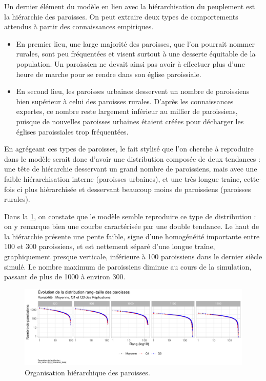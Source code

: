 Un dernier élément du modèle en lien avec la hiérarchisation du peuplement est la hiérarchie des paroisses.
On peut extraire deux types de comportements attendus à partir des connaissances empiriques.
\begin{itemize}
	\item En premier lieu, une large majorité des paroisses, que l'on pourrait nommer \og rurales\fg{}, sont peu fréquentées et visent surtout à une desserte équitable de la population.
	Un paroissien ne devait ainsi pas avoir à effectuer plus d'une heure de marche pour se rendre dans son église paroissiale.
	\item En second lieu, les paroisses \og urbaines\fg{} desservent un nombre de paroissiens bien supérieur à celui des paroisses rurales.
	D'après les connaissances expertes, ce nombre reste largement inférieur au millier de paroissiens, puisque de nouvelles paroisses urbaines étaient créées pour décharger les églises paroissiales trop fréquentées.
\end{itemize}
En agrégeant ces types de paroisses, le fait stylisé que l'on cherche à reproduire dans le modèle serait donc d'avoir une distribution composée de deux tendances : une tête de hiérarchie desservant un grand nombre de paroissiens, mais avec une faible hiérarchisation interne (paroisses urbaines), et une très longue traine, cette-fois ci plus hiérarchisée et desservant beaucoup moins de paroissiens (paroisses rurales).


Dans la \cref{fig:results-rt-paroisses}, on constate que le modèle semble reproduire ce type de distribution : on y remarque bien une courbe caractérisée par une double tendance.
Le haut de la hiérarchie présente une pente faible, signe d'une homogénéité importante entre 100 et 300 paroissiens, et est nettement séparé d'une longue traîne, graphiquement presque verticale, inférieure à 100 paroissiens dans le dernier siècle simulé.
Le nombre maximum de paroissiens diminue au cours de la simulation, passant de plus de 1000 à environ 300.

\begin{figure}[H]
	\centering
	\includegraphics[width=\linewidth]{img/results_6_6/Paroisses_RT_Haut.pdf}
	\caption{Organisation hiérarchique des paroisses.}
	\label{fig:results-rt-paroisses}
\end{figure}


